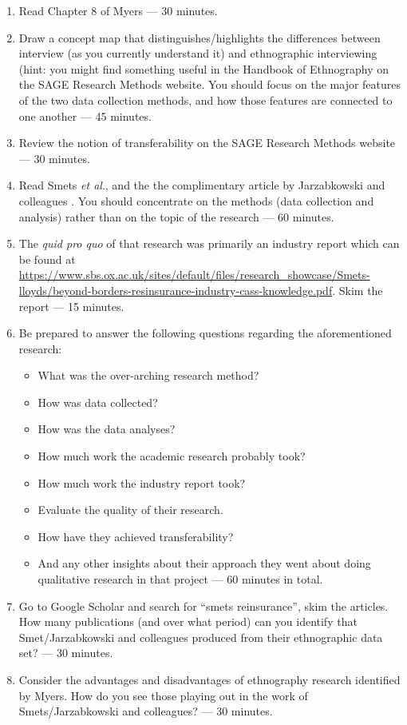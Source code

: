 \documentclass[]{book}
\providecommand{\tightlist}{%
  \setlength{\itemsep}{0pt}\setlength{\parskip}{0pt}}
\theoremstyle{definition}
\theoremstyle{definition}
\theoremstyle{definition}
\theoremstyle{remark}
\begin{document}
\begin{enumerate}
\def\labelenumi{\arabic{enumi}.}
\item
  Read Chapter 8 of Myers \autocite*[
  p.~92--103]{myers_2013_qualitativeresearchbusiness} --- 30 minutes.
\item
  Draw a concept map that distinguishes/highlights the differences
  between interview (as you currently understand it) and ethnographic
  interviewing (hint: you might find something useful in the Handbook of
  Ethnography on the SAGE Research Methods website. You should focus on
  the major features of the two data collection methods, and how those
  features are connected to one another --- 45 minutes.
\item
  Review the notion of transferability on the SAGE Research Methods
  website --- 30 minutes.
\item
  Read Smets \emph{et al}.,
  \autocite{smets_2015_reinsurancetradinglloyd} and the the
  complimentary article by Jarzabkowski and colleagues
  \autocite{jarzabkowski_2015_conductingglobalteambased}. You should
  concentrate on the methods (data collection and analysis) rather than
  on the topic of the research --- 60 minutes.
\item
  The \emph{quid pro quo} of that research was primarily an industry
  report which can be found at
  \url{https://www.sbs.ox.ac.uk/sites/default/files/research_showcase/Smets-lloyds/beyond-borders-resinsurance-industry-cass-knowledge.pdf}.
  Skim the report --- 15 minutes.
\item
  Be prepared to answer the following questions regarding the
  aforementioned research:

  \begin{itemize}
  \tightlist
  \item
    What was the over-arching research method?
  \item
    How was data collected?
  \item
    How was the data analyses?
  \item
    How much work the academic research probably took?
  \item
    How much work the industry report took?
  \item
    Evaluate the quality of their research.
  \item
    How have they achieved transferability?
  \item
    And any other insights about their approach they went about doing
    qualitative research in that project --- 60 minutes in total.
  \end{itemize}
\item
  Go to Google Scholar and search for ``smets reinsurance'', skim the
  articles. How many publications (and over what period) can you
  identify that Smet/Jarzabkowski and colleagues produced from their
  ethnographic data set? --- 30 minutes.
\item
  Consider the advantages and disadvantages of ethnography research
  identified by Myers. How do you see those playing out in the work of
  Smets/Jarzabkowski and colleagues? --- 30 minutes.
\end{enumerate}
\end{document}
